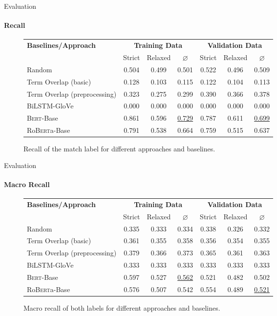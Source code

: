 \documentclass[english,handout]{mlutalk}
\newcommand{\BiLSTM}{\mbox{BiLSTM}\xspace}
\newcommand{\Bert}{\textsc{Bert}\xspace}
\newcommand{\BertBase}{\Bert-Base\xspace}
\newcommand{\Roberta}{\mbox{Ro\textsc{Bert}a}\xspace}
\newcommand{\RobertaBase}{\Roberta-Base\xspace}
\begin{document}
\begin{frame}{Evaluation}
  \framesubtitle{Recall}
  \begin{figure}
    \centering
    \caption{Recall of the match label for different approaches and baselines.}
    \scriptsize
    \begin{tabular}{lcccccc}
      \toprule
      \textbf{Baselines/Approach} & \multicolumn{3}{c}{\textbf{Training Data}} & \multicolumn{3}{c}{\textbf{Validation Data}} \\
      \cmidrule(r{0.5em}){2-4} \cmidrule(l{0.5em}){5-7}
      & Strict & Relaxed & \(\varnothing\) & Strict & Relaxed & \(\varnothing\) \\
      \midrule
      Random 
      & 0.504 & 0.499 & 0.501 & 0.522 & 0.496 & 0.509 \\
      Term Overlap (basic)
      & 0.128 & 0.103 & 0.115 & 0.122 & 0.104 & 0.113 \\
      Term Overlap (preprocessing)
      & 0.323 & 0.275 & 0.299 & 0.390 & 0.366 & 0.378 \\
      \midrule
      \BiLSTM-GloVe
      & 0.000 & 0.000 & 0.000 & 0.000 & 0.000 & 0.000 \\
      \BertBase
      & 0.861 & 0.596 & \underline{0.729} & 0.787 & 0.611 & \underline{0.699} \\
      \RobertaBase
      & 0.791 & 0.538 & 0.664 & 0.759 & 0.515 & 0.637 \\
      \bottomrule
    \end{tabular}
  \end{figure}
\end{frame}

\begin{frame}{Evaluation}
  \framesubtitle{Macro Recall}
  \begin{figure}
    \centering
    \caption{Macro recall of both labels for different approaches and baselines.}
    \scriptsize
    \begin{tabular}{lcccccc}
      \toprule
      \textbf{Baselines/Approach} & \multicolumn{3}{c}{\textbf{Training Data}} & \multicolumn{3}{c}{\textbf{Validation Data}} \\
      \cmidrule(r{0.5em}){2-4} \cmidrule(l{0.5em}){5-7}
      & Strict & Relaxed & \(\varnothing\) & Strict & Relaxed & \(\varnothing\) \\
      \midrule
      Random 
      & 0.335 & 0.333 & 0.334 & 0.338 & 0.326 & 0.332 \\
      Term Overlap (basic)
      & 0.361 & 0.355 & 0.358 & 0.356 & 0.354 & 0.355 \\
      Term Overlap (preprocessing)
      & 0.379 & 0.366 & 0.373 & 0.365 & 0.361 & 0.363 \\
      \midrule
      \BiLSTM-GloVe
      & 0.333 & 0.333 & 0.333 & 0.333 & 0.333 & 0.333 \\
      \BertBase
      & 0.597 & 0.527 & \underline{0.562} & 0.521 & 0.482 & 0.502 \\
      \RobertaBase
      & 0.576 & 0.507 & 0.542 & 0.554 & 0.489 & \underline{0.521} \\
      \bottomrule
    \end{tabular}
  \end{figure}
\end{frame}
\end{document}
